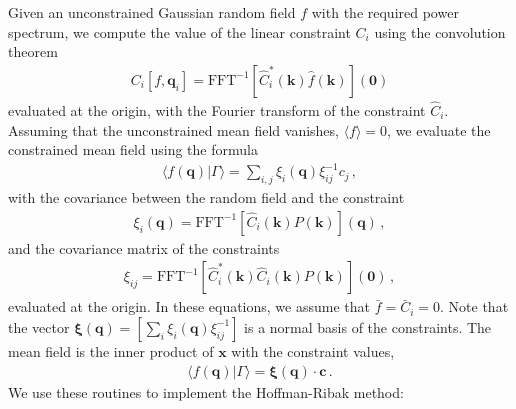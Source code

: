 \documentclass[a4paper, 11pt]{article}
\begin{document}
Given an unconstrained Gaussian random field $f$ with the required power spectrum, we compute the value of the linear constraint $C_i$ using the convolution theorem
\begin{align}
C_i[f,\bm{q}_i]=\text{FFT}^{-1}[\hat{C}_i^*(\bm{k}) \hat{f}(\bm{k})](\bm{0})
\end{align}
evaluated at the origin, with the Fourier transform of the constraint $\hat{C}_i$. Assuming that the unconstrained mean field vanishes, $\langle f \rangle =0$, we evaluate the constrained mean field using the formula
\begin{align}
\langle f(\bm{q}) | \Gamma\rangle = \sum_{i,j} \xi_i(\bm{q})\xi_{ij}^{-1} c_j\,,
\end{align}
with the covariance between the random field and the constraint
\begin{align}
\xi_i(\bm{q}) = \text{FFT}^{-1}[\hat{C}_i(\bm{k}) P(\bm{k})](\bm{q})\,,
\end{align}
and the covariance matrix of the constraints
\begin{align}
\xi_{ij}=\text{FFT}^{-1}[\hat{C}_i^*(\bm{k}) \hat{C}_i(\bm{k}) P(\bm{k})](\bm{0})\,,
\end{align}
evaluated at the origin. In these equations, we assume that $\bar{f}=\bar{C}_i=0$. Note that the vector $\bm{\xi}(\bm{q})=[\sum_i \xi_i(\bm{q}) \xi_{ij}^{-1}]$ is a normal basis of the constraints. The mean field is the inner product of $\bm{x}$ with the constraint values, 
\begin{align}
\langle f(\bm{q}) | \Gamma\rangle = \bm{\xi}(\bm{q})\cdot \bm{c}\,.
\end{align}
We use these routines to implement the Hoffman-Ribak method:\\
\end{document}
